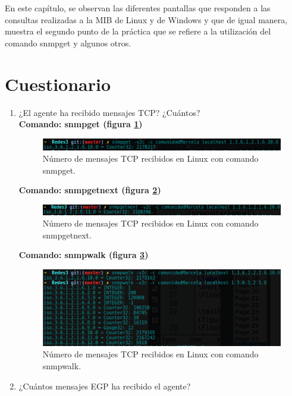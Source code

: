 En este capítulo, se observan las diferentes pantallas que responden a las consultas realizadas a la MIB de Linux y de Windows y que de igual manera, muestra el segundo punto de la práctica que se refiere a la utilización del comando snmpget y algunos otros.
\section{Cuestionario}
\begin{enumerate}


\item ¿El agente ha recibido mensajes TCP? ¿Cuántos?\\
\textbf{Comando: snmpget (figura \ref{image:tcpget})}
\FloatBarrier
\begin{figure}[htbp!]
		\centering
	\includegraphics[width=.9 \textwidth]{images/tcpget}
		\caption{Número de mensajes TCP recibidos en Linux con comando snmpget.}		\label{image:tcpget}
\end{figure}
\FloatBarrier

\textbf{Comando: snmpgetnext (figura \ref{image:tcpnext})}
\FloatBarrier
\begin{figure}[htbp!]
		\centering
	\includegraphics[width=.9 \textwidth]{images/tcpnext}
		\caption{Número de mensajes TCP recibidos en Linux con comando snmpgetnext.}		\label{image:tcpnext}
\end{figure}
\FloatBarrier

\textbf{Comando: snmpwalk (figura \ref{image:tcpwalk})}
\FloatBarrier
\begin{figure}[htbp!]
		\centering
	\includegraphics[width=.9 \textwidth]{images/tcpwalk}
		\caption{Número de mensajes TCP recibidos en Linux con comando snmpwalk.}		\label{image:tcpwalk}
\end{figure}
\FloatBarrier
\item ¿Cuántos mensajes EGP ha recibido el agente?


\end{enumerate}

